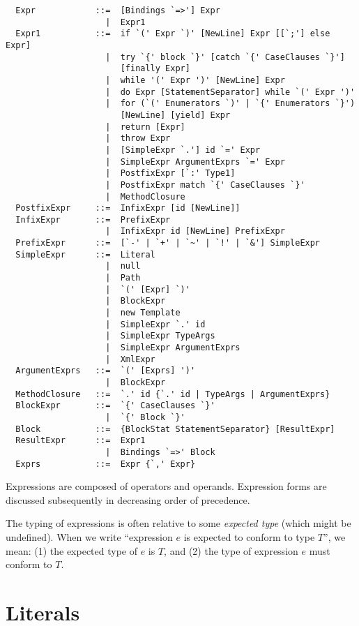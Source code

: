 \syntax\begin{lstlisting}
  Expr            ::=  [Bindings `=>'] Expr
                    |  Expr1
  Expr1           ::=  if `(' Expr `)' [NewLine] Expr [[`;'] else Expr]
                    |  try `{' block `}' [catch `{' CaseClauses `}'] 
                       [finally Expr]
                    |  while '(' Expr ')' [NewLine] Expr
                    |  do Expr [StatementSeparator] while `(' Expr ')'
                    |  for (`(' Enumerators `)' | `{' Enumerators `}') 
                       [NewLine] [yield] Expr
                    |  return [Expr]
                    |  throw Expr
                    |  [SimpleExpr `.'] id `=' Expr
                    |  SimpleExpr ArgumentExprs `=' Expr
                    |  PostfixExpr [`:' Type1]
                    |  PostfixExpr match `{' CaseClauses `}'
                    |  MethodClosure
  PostfixExpr     ::=  InfixExpr [id [NewLine]]
  InfixExpr       ::=  PrefixExpr
                    |  InfixExpr id [NewLine] PrefixExpr
  PrefixExpr      ::=  [`-' | `+' | `~' | `!' | `&'] SimpleExpr 
  SimpleExpr      ::=  Literal
                    |  null
                    |  Path
                    |  `(' [Expr] `)'
                    |  BlockExpr
                    |  new Template 
                    |  SimpleExpr `.' id 
                    |  SimpleExpr TypeArgs
                    |  SimpleExpr ArgumentExprs
                    |  XmlExpr
  ArgumentExprs   ::=  `(' [Exprs] ')'
                    |  BlockExpr
  MethodClosure   ::=  `.' id {`.' id | TypeArgs | ArgumentExprs}
  BlockExpr       ::=  `{' CaseClauses `}'
                    |  `{' Block `}'
  Block           ::=  {BlockStat StatementSeparator} [ResultExpr]
  ResultExpr      ::=  Expr1
                    |  Bindings `=>' Block
  Exprs           ::=  Expr {`,' Expr}
\end{lstlisting}

Expressions are composed of operators and operands. Expression forms are
discussed subsequently in decreasing order of precedence. 

The typing of expressions is often relative to some {\em expected
type} (which might be undefined).  
When we write ``expression $e$ is expected to conform to
type $T$'', we mean: (1) the expected type of $e$ is
$T$, and (2) the type of expression $e$ must conform to
$T$.

\section{Literals}

